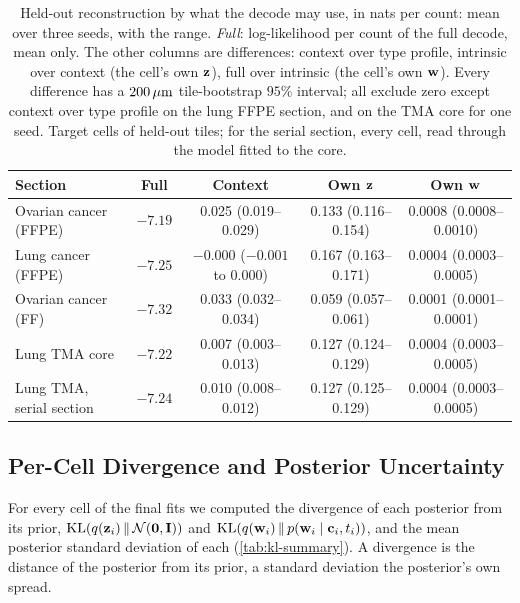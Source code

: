 \begin{table}[t]
\centering
\caption{Held-out reconstruction by what the decode may use, in nats per count: mean over three seeds, with the range. \emph{Full}: log-likelihood per count of the full decode, mean only. The other columns are differences: context over type profile, intrinsic over context (the cell's own $\mathbf{z}$), full over intrinsic (the cell's own $\mathbf{w}$). Every difference has a $200\,\mu\text{m}$ tile-bootstrap $95\%$ interval; all exclude zero except context over type profile on the lung FFPE section, and on the TMA core for one seed. Target cells of held-out tiles; for the serial section, every cell, read through the model fitted to the core.}
\label{tab:recon-modes}
\small
\setlength{\tabcolsep}{4pt}
\begin{tabular}{@{}lcccc@{}}
\toprule
Section & Full & Context & Own $\mathbf{z}$ & Own $\mathbf{w}$ \\
\midrule
Ovarian cancer (FFPE) & $-7.19$ & 0.025 (0.019--0.029) & 0.133 (0.116--0.154) & 0.0008 (0.0008--0.0010) \\
Lung cancer (FFPE) & $-7.25$ & $-0.000$ ($-0.001$ to $0.000$) & 0.167 (0.163--0.171) & 0.0004 (0.0003--0.0005) \\
Ovarian cancer (FF) & $-7.32$ & 0.033 (0.032--0.034) & 0.059 (0.057--0.061) & 0.0001 (0.0001--0.0001) \\
Lung TMA core & $-7.22$ & 0.007 (0.003--0.013) & 0.127 (0.124--0.129) & 0.0004 (0.0003--0.0005) \\
Lung TMA, serial section & $-7.24$ & 0.010 (0.008--0.012) & 0.127 (0.125--0.129) & 0.0004 (0.0003--0.0005) \\
\bottomrule
\end{tabular}
\end{table}

\subsection{Per-Cell Divergence and Posterior Uncertainty}
\label{app:kl-maps}

For every cell of the final fits we computed the divergence of each posterior from its prior, $\operatorname{KL}(q(\mathbf{z}_i)\,\|\,\mathcal{N}(\mathbf{0},\mathbf{I}))$ and $\operatorname{KL}(q(\mathbf{w}_i)\,\|\,p(\mathbf{w}_i \mid \mathbf{c}_i, t_i))$, and the mean posterior standard deviation of each (\cref{tab:kl-summary}). A divergence is the distance of the posterior from its prior, a standard deviation the posterior's own spread.

